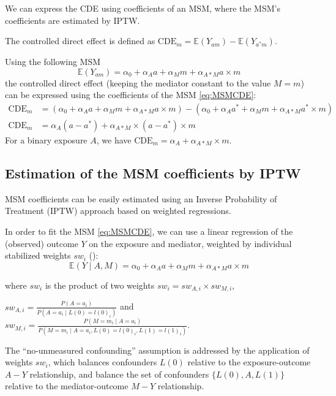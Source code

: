 \documentclass[
]{book}
\begin{document}
We can express the CDE using coefficients of an MSM, where the MSM's coefficients are estimated by IPTW.

The controlled direct effect is defined as \(\text{CDE}_m= \mathbb{E}(Y_{am}) - \mathbb{E}(Y_{a^*m})\).

Using the following MSM
\begin{equation} 
  \mathbb{E}(Y_{am}) = \alpha_0 + \alpha_A a + \alpha_M m + \alpha_{A \ast M} a \times m
  \label{eq:MSMCDE}
\end{equation}
the controlled direct effect (keeping the mediator constant to the value \(M=m\)) can be expressed using the coefficients of the MSM \eqref{eq:MSMCDE}:
\begin{align*} 
  \text{CDE}_m &= (\alpha_0 + \alpha_A a + \alpha_M m + \alpha_{A \ast M} a \times m) - (\alpha_0 + \alpha_A a^* + \alpha_M m + \alpha_{A \ast M} a^* \times m) \\
  \text{CDE}_m &= \alpha_A(a - a^* ) + \alpha_{A \ast M} \times (a - a^*) \times m
\end{align*}
For a binary exposure \(A\), we have \(\text{CDE}_m=\alpha_A + \alpha_{A \ast M} \times m\).

\subsection{Estimation of the MSM coefficients by IPTW}\label{estimation-of-the-msm-coefficients-by-iptw}

MSM coefficients can be easily estimated using an Inverse Probability of Treatment (IPTW) approach based on weighted regressions.

In order to fit the MSM \eqref{eq:MSMCDE}, we can use a linear regression of the (observed) outcome \(Y\) on the exposure and mediator, weighted by individual stabilized weights \(sw_i\) ():
\begin{equation} 
  \mathbb{E}\left(Y \mid A,M\right) = \alpha_0 + \alpha_A a + \alpha_M m + \alpha_{A \ast M} a \times m
\end{equation}

where \(sw_i\) is the product of two weights \(sw_i = sw_{A,i} \times sw_{M,i}\),

\(sw_{A,i}=\frac{P(A=a_i)}{P(A=a_i \mid L(0)=l(0)_i)}\) and \(sw_{M,i}=\frac{P(M=m_i \mid A=a_i)}{P(M = m_i \mid A=a_i,L(0)=l(0)_i, L(1)=l(1)_i)}\).

The ``no-unmeasured confounding'' assumption is addressed by the application of weights \(sw_i\), which balances confounders \(L(0)\) relative to the exposure-outcome \(A-Y\) relationship, and balance the set of confounders \(\{L(0),A,L(1)\}\) relative to the mediator-outcome \(M-Y\) relationship.
\end{document}
